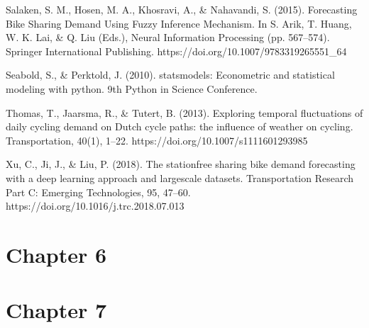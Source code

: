 \documentclass[letterpaper,10pt,english]{jupyterBook}
\begin{document}
\sphinxAtStartPar
Salaken, S. M., Hosen, M. A., Khosravi, A., \& Nahavandi, S. (2015). Forecasting Bike Sharing Demand Using Fuzzy Inference Mechanism. In S. Arik, T. Huang, W. K. Lai, \& Q. Liu (Eds.), Neural Information Processing (pp. 567–574). Springer International Publishing. https://doi.org/10.1007/978\sphinxhyphen{}3\sphinxhyphen{}319\sphinxhyphen{}26555\sphinxhyphen{}1\_64

\sphinxAtStartPar
Seabold, S., \& Perktold, J. (2010). statsmodels: Econometric and statistical modeling with python. 9th Python in Science Conference.

\sphinxAtStartPar
Thomas, T., Jaarsma, R., \& Tutert, B. (2013). Exploring temporal fluctuations of daily cycling demand on Dutch cycle paths: the influence of weather on cycling. Transportation, 40(1), 1–22. https://doi.org/10.1007/s11116\sphinxhyphen{}012\sphinxhyphen{}9398\sphinxhyphen{}5

\sphinxAtStartPar
Xu, C., Ji, J., \& Liu, P. (2018). The station\sphinxhyphen{}free sharing bike demand forecasting with a deep learning approach and large\sphinxhyphen{}scale datasets. Transportation Research Part C: Emerging Technologies, 95, 47–60. https://doi.org/10.1016/j.trc.2018.07.013


\section{Chapter 6}
\label{\detokenize{references:chapter-6}}

\section{Chapter 7}
\label{\detokenize{references:chapter-7}}






\renewcommand{\indexname}{Index}
\printindex
\end{document}
